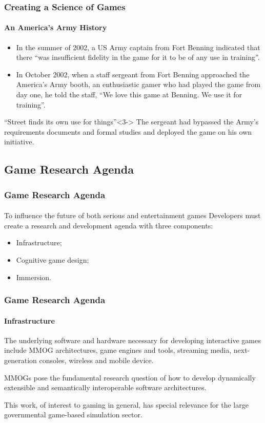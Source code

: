 \begin{frame}
\frametitle{Creating a Science of Games}
\framesubtitle{An America's Army History}
\begin{itemize}
\item <1->
In the summer of 2002, a US Army captain from Fort Benning indicated that there
``was insufficient fidelity in the game for it to be of any use in training''.
\item <2->
In October 2002, when a staff sergeant from Fort Benning approached the
America's Army booth, an enthusiastic gamer who had played the game from
day one, he told the staff, ``We love this game at Benning. We use it for
training''.
\end{itemize}

\begin{block}{``Street finds its own use for things''}<3->
The sergeant had bypassed the Army's requirements documents and formal studies
and deployed the game on his own initiative.
\end{block}
\end{frame}


\subsection{Game Research Agenda}

\begin{frame}
\frametitle{Game Research Agenda}
\framesubtitle{}
\begin{block}{
To influence the future of both serious and entertainment games}
Developers must create a research and development agenda with three components:
\begin{itemize}
\item %
Infrastructure;
\item %
Cognitive game design;
\item %
Immersion.
\end{itemize}
\end{block}
\end{frame}

\begin{frame}
\frametitle{Game Research Agenda}
\framesubtitle{Infrastructure}
The underlying software and hardware necessary for developing interactive
games include \alert{MMOG architectures}, game engines and tools,
streaming media, next-generation consoles, wireless and mobile device.
\pause
\begin{block}{}
MMOGs pose the fundamental research
question of how to develop dynamically extensible
and semantically interoperable software architectures.
\end{block}
\pause
\vfill
This work, of interest to gaming in general, has special relevance for the
large governmental game-based simulation sector.
\end{frame}

